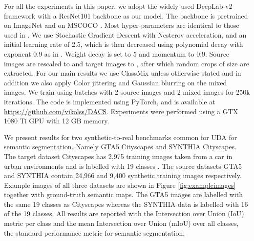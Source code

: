 \documentclass[10pt,twocolumn,letterpaper]{article}
\begin{document}
\vspace{0.4cm}
For all the experiments in this paper, we adopt the widely used \cite{tsai2018learning,luo2019significanceaware,luo2018taking,yang2019adversarial,tsai2019domain,vu2018advent,zhang2018fully,zou2018domain,zou2019confidence,li2019bidirectional,yang2020contextaware,zheng2019unsupervised,zheng2020rectifying, yang2020fda, wang2020differential, lv2020PIT, DBLP:journals/corr/abs-2008-12197, yang2020labelddriven, DBLP:conf/cvpr/KimB20a, DBLP:conf/nips/ZhangZ0T19} DeepLab-v2 framework \cite{DeepLabv2} with a ResNet101 backbone \cite{ResNet} as our model. The backbone is pretrained on ImageNet \cite{imagenet} and on MSCOCO \cite{mscoco}. Most hyper-parameters are identical to those used in \cite{tsai2018learning}. We use Stochastic Gradient Descent with Nesterov acceleration, and an initial learning rate of 2.5, which is then decreased using polynomial decay with exponent 0.9 as in \cite{DeepLabv2}. Weight decay is set to 5 and momentum to 0.9. Source images are rescaled to  and target images to , after which random crops of size  are extracted. For our main results we use ClassMix unless otherwise stated and in addition we also apply Color jittering and Gaussian blurring on the mixed images. We train using batches with 2 source images and 2 mixed images for 250k iterations. The code is implemented using PyTorch, and is available at \url{https://github.com/vikolss/DACS}. Experiments were performed using a GTX 1080 Ti GPU with 12 GB memory.

\vspace{0.4cm}
 We present results for two synthetic-to-real benchmarks common for UDA for semantic segmentation. Namely GTA5  Cityscapes and SYNTHIA  Cityscapes. The target dataset Cityscapes has 2,975 training images taken from a car in urban environments and is labelled with 19 classes \cite{Cityscapes}. The source datasets GTA5 \cite{GTAdataset} and SYNTHIA \cite{SYNTHIAdataset} contain 24,966 and 9,400 synthetic training images respectively. Example images of all three datasets are shown in Figure \ref{fig:exampleimages} together with ground-truth semantic maps. The GTA5 images are labelled with the same 19 classes as Cityscapes whereas the SYNTHIA data is labelled with 16 of the 19 classes. All results are reported with the Intersection over Union (IoU) metric per class and the mean Intersection over Union (mIoU) over all classes, the standard performance metric for semantic segmentation.
\end{document}
